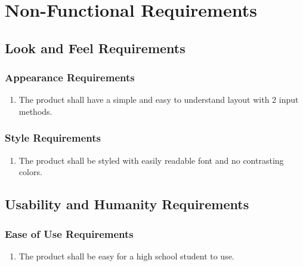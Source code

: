 \documentclass[]{article}
\newcounter{saveenum}
\newcommand{\pauseEnum}{\setcounter{saveenum}{\value{enumi}}}
\newcommand{\resumeEnum}{\setcounter{enumi}{\value{saveenum}}}
\begin{document}
\section{Non-Functional Requirements}
\label{sec:non-functional_requirements}
\subsection{Look and Feel Requirements}
\label{sub:look_and_feel_requirements}

\subsubsection{Appearance Requirements}
\label{ssub:appearance_requirements}
\begin{enumerate}[{LF}1. ]
	\item The product shall have a simple and easy to understand layout with 2 input methods.
	\pauseEnum
\end{enumerate}

\subsubsection{Style Requirements}
\label{ssub:style_requirements}
\begin{enumerate}[{LF}1.]
	\resumeEnum
	\item The product shall be styled with easily readable font and no contrasting colors.
\end{enumerate}


\subsection{Usability and Humanity Requirements}
\label{sub:usability_and_humanity_requirements}

\subsubsection{Ease of Use Requirements}
\label{ssub:ease_of_use_requirements}
\begin{enumerate}[{UH}1. ]
	\item The product shall be easy for a high school student to use.
	\pauseEnum
\end{enumerate}
\end{document}
